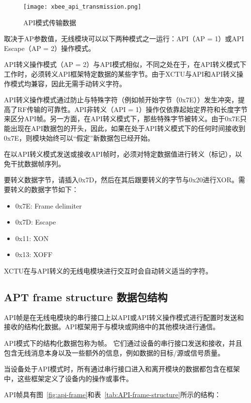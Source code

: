 \begin{figure}[htbp]
    \centering
    \texttt{[image: xbee\_api\_transmission.png]}
    \caption{API模式传输数据}
    \label{fig:xbee_api_transmission}
\end{figure}


取决于AP参数值，无线模块可以以下两种模式之一运行：API（AP = 1）或API Escape（AP = 2）操作模式。

API转义操作模式（AP = 2）与API模式相似，不同之处在于，在API转义模式下工作时，必须转义API框架特定数据的某些字节。由于XCTU与API和API转义操作模式均兼容，因此无需手动转义字符。

API转义操作模式通过防止与特殊字符（例如帧开始字节（0x7E））发生冲突，提高了RF传输的可靠性。API非转义（API = 1）操作仅依靠起始定界符和长度字节来区分API帧。另一方面，在API转义模式下，那些特殊字节被转义。由于0x7E只能出现在API数据包的开头，因此，如果在处于API转义模式下的任何时间接收到0x7E，则模块始终可以“假定”新数据包已经开始。

在以API转义模式发送或接收API帧时，必须对特定数据值进行转义（标记），以免干扰数据帧序列。

要转义数据字节，请插入0x7D，然后在其后跟要转义的字节与0x20进行XOR。需要转义的数据字节如下：

\begin{itemize}
    \item 0x7E: Frame delimiter
    \item 0x7D: Escape
    \item 0x11: XON
    \item 0x13: XOFF    
\end{itemize}

XCTU在与API转义的无线电模块进行交互时会自动转义适当的字符。

\subsection{APT frame structure 数据包结构}

API帧是在无线电模块的串行接口上​​以API或API转义操作模式进行配置时发送和接收的结构化数据。API框架用于与模块或网络中的其他模块进行通信。

API模式下的结构化数据包称为帧。 它们通过设备的串行接口发送和接收，并且包含无线消息本身以及一些额外的信息，例如数据的目标/源或信号质量。

当设备处于API模式时，所有通过串行接口进入和离开模块的数据都包含在框架中，这些框架定义了设备内的操作或事件。

API帧具有图~\ref{fig:api-frame}和表~\ref{tab:API-frame-structure}所示的结构：

